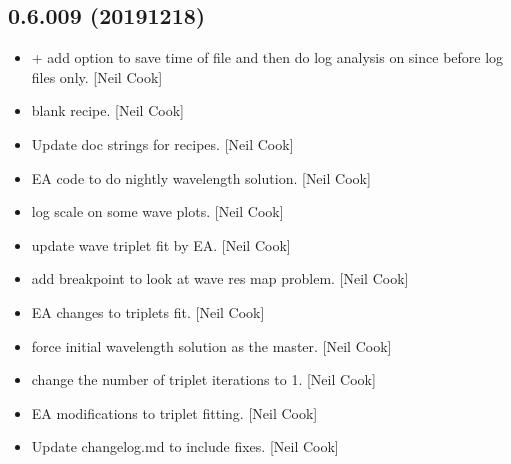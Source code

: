 \documentclass[a4paper,10pt,english]{report}
\begin{document}
\subsection{0.6.009 (2019\sphinxhyphen{}12\sphinxhyphen{}18)}
\label{\detokenize{misc/changelog:id29}}\begin{itemize}
\item {} 
 +  \sphinxhyphen{} add option to save time of
file and then do log analysis on \textendash{}since \textendash{}before log files only.
{[}Neil Cook{]}

\item {} 
 \sphinxhyphen{} blank recipe. {[}Neil Cook{]}

\item {} 
Update doc strings for recipes. {[}Neil Cook{]}

\item {} 
 \sphinxhyphen{} EA code to do nightly
wavelength solution. {[}Neil Cook{]}

\item {} 
 \sphinxhyphen{} log scale on some wave plots. {[}Neil Cook{]}

\item {} 
 \sphinxhyphen{} update wave triplet fit by EA. {[}Neil Cook{]}

\item {} 
 \sphinxhyphen{} add breakpoint to look at wave res map
problem. {[}Neil Cook{]}

\item {} 
 \sphinxhyphen{} EA changes to triplets fit. {[}Neil Cook{]}

\item {} 
 \sphinxhyphen{} force initial wavelength solution
as the master. {[}Neil Cook{]}

\item {} 
 \sphinxhyphen{} change the number of
triplet iterations to 1. {[}Neil Cook{]}

\item {} 
 \sphinxhyphen{} EA modifications to triplet fitting. {[}Neil
Cook{]}

\item {} 
Update changelog.md to include  fixes. {[}Neil Cook{]}

\end{itemize}
\end{document}

